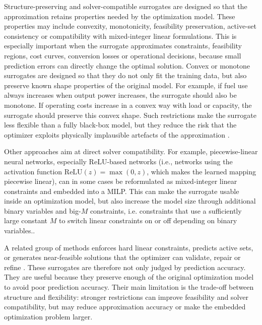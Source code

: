 Structure-preserving and solver-compatible surrogates are designed so
that the approximation retains properties needed by the optimization
model. These properties may include convexity, monotonicity, feasibility
preservation, active-set consistency or compatibility with mixed-integer
linear formulations. This is especially important when the surrogate
approximates constraints, feasibility regions, cost curves, conversion
losses or operational decisions, because small prediction errors can
directly change the optimal solution. Convex or monotone surrogates are
designed so that they do not only fit the training data, but also
preserve known shape properties of the original model. For example, if
fuel use always increases when output power increases, the surrogate
should also be monotone. If operating costs increase in a convex way
with load or capacity, the surrogate should preserve this convex shape.
Such restrictions make the surrogate less flexible than a fully
black-box model, but they reduce the risk that the optimizer exploits
physically implausible artefacts of the approximation
\cite{Wang2020202933,Hirvonen2017323,Liu20223726,Chen2023657,Chen20244723}.

Other approaches aim at direct solver compatibility. For example,
piecewise-linear neural networks, especially ReLU-based networks (i.e.,
networks using the activation function $\mathrm{ReLU}(z)=\max(0,z)$,
which makes the learned mapping piecewise linear), can in some cases be
reformulated as mixed-integer linear constraints and embedded into a
MILP. This can make the surrogate usable inside an optimization model,
but also increase the model size through additional binary variables and
big-$M$ constraints, i.e. constraints that use a sufficiently large
constant $M$ to switch linear constraints on or off depending on binary
variables.\cite{Wu2022231,Chen2022,Xu20223066,Lin2023}.

A related group of methods enforces hard linear constraints, predicts
active sets, or generates near-feasible solutions that the optimizer can
validate, repair or refine \cite{Chen20244723,Li202359995}. These
surrogates are therefore not only judged by prediction accuracy. They
are useful because they preserve enough of the original optimization
model to avoid poor prediction accuracy. Their main limitation is the
trade-off between structure and flexibility: stronger restrictions can
improve feasibility and solver compatibility, but may reduce
approximation accuracy or make the embedded optimization problem larger.

